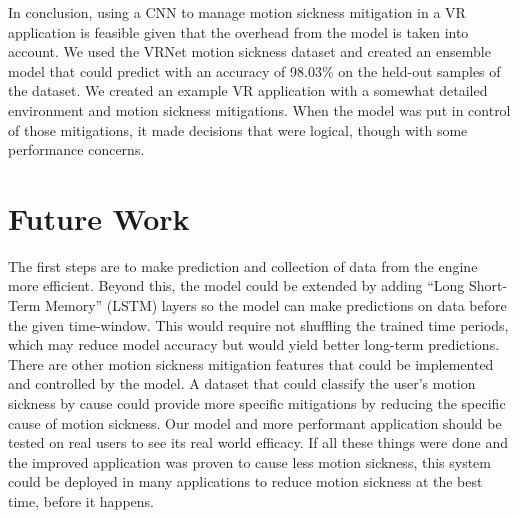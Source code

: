 In conclusion, using a CNN to manage motion sickness mitigation in a VR application is feasible given that the overhead from the model is taken into account.
We used the VRNet motion sickness dataset and created an ensemble model that could predict with an accuracy of 98.03\% on the held-out samples of the dataset.
We created an example VR application with a somewhat detailed environment and motion sickness mitigations.
When the model was put in control of those mitigations, it made decisions that were logical, though with some performance concerns.

\section{Future Work}
\label{sec:future_work}
The first steps are to make prediction and collection of data from the engine more efficient.
Beyond this, the model could be extended by adding ``Long Short-Term Memory'' (LSTM) layers so the model can make predictions on data before the given time-window.
This would require not shuffling the trained time periods, which may reduce model accuracy but would yield better long-term predictions.
There are other motion sickness mitigation features that could be implemented and controlled by the model.
A dataset that could classify the user's motion sickness by cause could provide more specific mitigations by reducing the specific cause of motion sickness.
Our model and more performant application should be tested on real users to see its real world efficacy.
If all these things were done and the improved application was proven to cause less motion sickness, this system could be deployed in many applications to reduce motion sickness at the best time, before it happens.